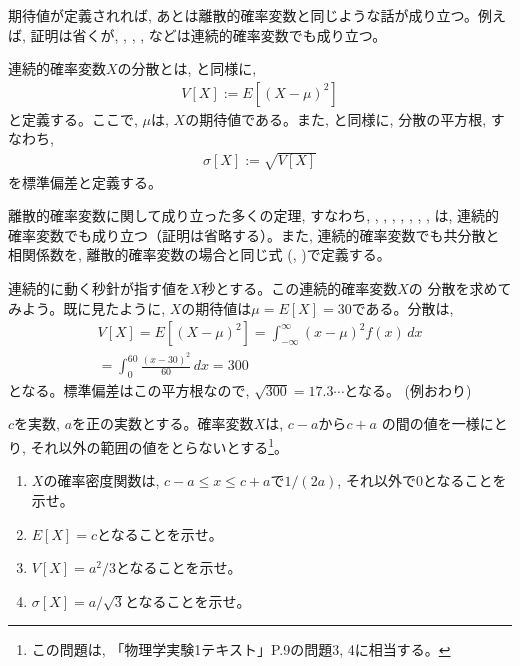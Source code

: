 期待値が定義されれば, あとは離散的確率変数と同じような話が成り立つ。例えば, 
証明は省くが, , , , 
などは連続的確率変数でも成り立つ。

連続的確率変数$X$の分散とは, と同様に, 
\begin{eqnarray}
V[X]:=E[(X-\mu)^2]\label{eq:defvarcon}
\end{eqnarray}
と定義する。ここで, $\mu$は, $X$の期待値である。また, と同様に, 分散の平方根, すなわち, 
\begin{eqnarray}
\sigma[X]:=\sqrt{V[X]}\label{eq:defssdcon}
\end{eqnarray}
を標準偏差と定義する。

離散的確率変数に関して成り立った多くの定理, すなわち, 
, 
, 
, 
, 
, 
, 
, 
は, 連続的確率変数でも成り立つ（証明は省略する）。また, 
連続的確率変数でも共分散と相関係数を, 離散的確率変数の場合と同じ式
(, )で定義する。\\

\begin{exmpl}
連続的に動く秒針が指す値を$X$秒とする。この連続的確率変数$X$の
分散を求めてみよう。既に見たように, $X$の期待値は$\mu=E[X]=30$である。分散は, 
\begin{eqnarray*}
V[X]=E[(X-\mu)^2]=\int_{-\infty}^{\infty}(x-\mu)^2f(x)\,dx\\
=\int_{0}^{60}\frac{(x-30)^2}{60}\,dx=300
\end{eqnarray*}
となる。標準偏差はこの平方根なので, $\sqrt{300}=17.3\cdots$となる。
(例おわり)\end{exmpl}
\mv

\begin{q}\label{q:stat_uniform} $c$を実数, $a$を正の実数とする。確率変数$X$は, $c-a$から$c+a$
の間の値を一様にとり, それ以外の範囲の値をとらないとする\footnote{
この問題は, 「物理学実験1テキスト」P.9の問題3, 4に相当する。}。
\begin{enumerate}
\item $X$の確率密度関数は, $c-a\leq x\leq c+a$で$1/(2a)$, それ以外で0となることを示せ。
\item $E[X]=c$となることを示せ。
\item $V[X]=a^2/3$となることを示せ。
\item $\sigma[X]=a/\sqrt{3}$となることを示せ。
\end{enumerate}\end{q}
\vv


